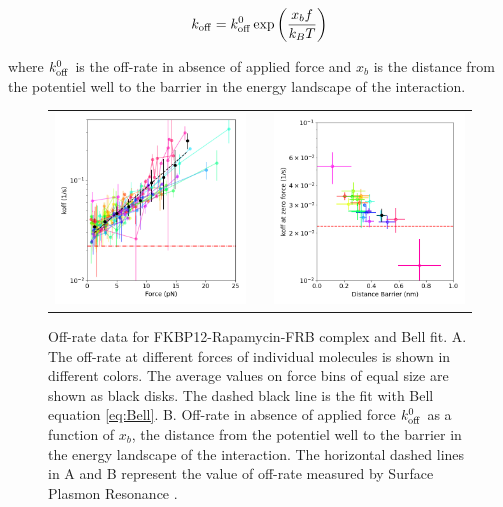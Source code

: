 \documentclass{biophys-new}
\begin{document}
\begin{equation}
\label{eq:Bell}
k_{\rm off} = k^0_{\rm off} \exp \left(\frac{x_b f}{k_B T}\right)
\end{equation}

\noindent where $k^0_{\rm off}$ is the off-rate in absence of applied force and $x_b$ is the distance from the potentiel well to the barrier in the energy landscape of the interaction.

\begin{figure}[hbt!]
	\centering
	\centering
	\begin{tabular}{ccc}
		\includegraphics[width=0.45\linewidth]{Figures/offrate_vs_force_Rapa.png} & &	
		\includegraphics[width=0.45\linewidth]{Figures/koff0_vs_xBeta_Rapa.png}		 \\
	\end{tabular}
	\caption{Off-rate data for FKBP12-Rapamycin-FRB complex and Bell fit. A. The off-rate at different forces of individual molecules is shown in different colors. The average values on force bins of equal size are shown as black disks. The dashed black line is the fit with Bell equation \ref{eq:Bell}. B. Off-rate in absence of applied force $k^0_{\rm off}$ as a function of $x_b$, the distance from the potentiel well to the barrier in the energy landscape of the interaction. The horizontal dashed lines in A and B represent the value of off-rate measured by Surface Plasmon Resonance \cite{banaszynski2005}.}
	\label{fig:bell_parameters}	
\end{figure}
\end{document}
